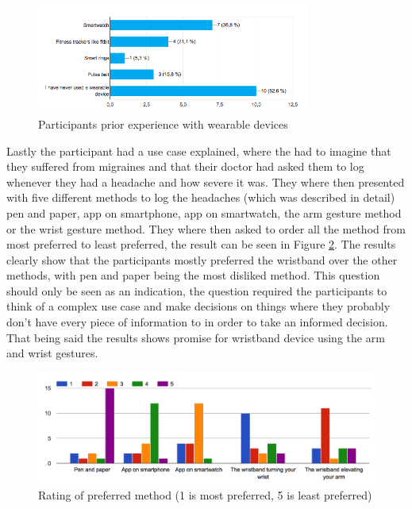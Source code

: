 \begin{figure}[]
    \centering
    \includegraphics[width=0.8\textwidth]{figures/wearable_experience.png}
    \caption{Participants prior experience with wearable devices}
    \label{wearable_experience}
\end{figure}

Lastly the participant had a use case explained, where the had to imagine that they suffered from migraines and that their doctor had asked them to log whenever they had a headache and how severe it was. They where then presented with five different methods to log the headaches (which was described in detail) pen and paper, app on smartphone, app on smartwatch, the arm gesture method or the wrist gesture method. They where then asked to order all the method from most preferred to least preferred, the result can be seen in Figure \ref{preferred_method}. The results clearly show that the participants mostly preferred the wristband over the other methods, with pen and paper being the most disliked method. This question should only be seen as an indication, the question required the participants to think of a complex use case and make decisions on things where they probably don't have every piece of information to in order to take an informed decision. That being said the results shows promise for wristband device using the arm and wrist gestures.

\begin{figure}[]
    \centering
    \includegraphics[width=1\textwidth]{figures/preferred_method.png}
    \caption{Rating of preferred method (1 is most preferred, 5 is least preferred)}
    \label{preferred_method}
\end{figure}

